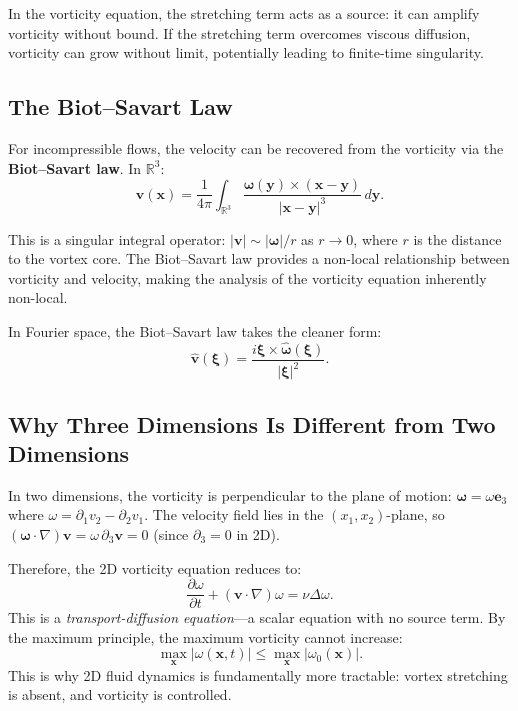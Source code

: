In the vorticity equation, the stretching term acts as a source: it can amplify vorticity without bound. If the stretching term overcomes viscous diffusion, vorticity can grow without limit, potentially leading to finite-time singularity.

\subsection{The Biot--Savart Law}

For incompressible flows, the velocity can be recovered from the vorticity via the \textbf{Biot--Savart law}. In $\mathbb{R}^3$:
\begin{equation}
\label{eq:biot-savart}
\mathbf{v}(\mathbf{x}) = \frac{1}{4\pi} \int_{\mathbb{R}^3} \frac{\boldsymbol{\omega}(\mathbf{y}) \times (\mathbf{x} - \mathbf{y})}{|\mathbf{x} - \mathbf{y}|^3} \, d\mathbf{y}.
\end{equation}

This is a singular integral operator: $|\mathbf{v}| \sim |\boldsymbol{\omega}| / r$ as $r \to 0$, where $r$ is the distance to the vortex core. The Biot--Savart law provides a non-local relationship between vorticity and velocity, making the analysis of the vorticity equation inherently non-local.

In Fourier space, the Biot--Savart law takes the cleaner form:
\[
\hat{\mathbf{v}}(\boldsymbol{\xi}) = \frac{i \boldsymbol{\xi} \times \hat{\boldsymbol{\omega}}(\boldsymbol{\xi})}{|\boldsymbol{\xi}|^2}.
\]

\subsection{Why Three Dimensions Is Different from Two Dimensions}

In two dimensions, the vorticity is perpendicular to the plane of motion: $\boldsymbol{\omega} = \omega \mathbf{e}_3$ where $\omega = \partial_1 v_2 - \partial_2 v_1$. The velocity field lies in the $(x_1, x_2)$-plane, so $(\boldsymbol{\omega} \cdot \nabla)\mathbf{v} = \omega \, \partial_3 \mathbf{v} = 0$ (since $\partial_3 = 0$ in 2D).

Therefore, the 2D vorticity equation reduces to:
\begin{equation}
\label{eq:vorticity-2D}
\frac{\partial \omega}{\partial t} + (\mathbf{v} \cdot \nabla)\omega = \nu \Delta \omega.
\end{equation}
This is a \emph{transport-diffusion equation}---a scalar equation with no source term. By the maximum principle, the maximum vorticity cannot increase:
\[
\max_{\mathbf{x}} |\omega(\mathbf{x}, t)| \le \max_{\mathbf{x}} |\omega_0(\mathbf{x})|.
\]
This is why 2D fluid dynamics is fundamentally more tractable: vortex stretching is absent, and vorticity is controlled.


